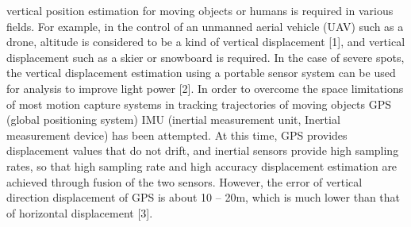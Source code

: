 \documentclass[10pt,journal,compsoc]{IEEEtran}
\begin{document}
\maketitle


\IEEEdisplaynontitleabstractindextext



%
\IEEEpeerreviewmaketitle





 vertical position estimation for moving objects or humans is required
in various fields. For example, in the control of an unmanned aerial vehicle
(UAV) such as a drone, altitude is considered to be a kind of vertical
displacement [1], and vertical displacement such as a skier or snowboard is
required. In the case of severe spots, the vertical displacement estimation
using a portable sensor system can be used for analysis to improve light power
[2]. In order to overcome the space limitations of most motion capture systems
in tracking trajectories of moving objects GPS (global positioning system) IMU
(inertial measurement unit,  Inertial measurement device) has been attempted.
At this time, GPS provides displacement values that do not drift,
and inertial sensors provide high sampling rates, so that high sampling rate
and high accuracy displacement estimation are achieved through fusion of the
two sensors. However, the error of vertical direction displacement of GPS is
about 10 -- 20m, which is much lower than that of horizontal displacement [3]. 
\end{document}
